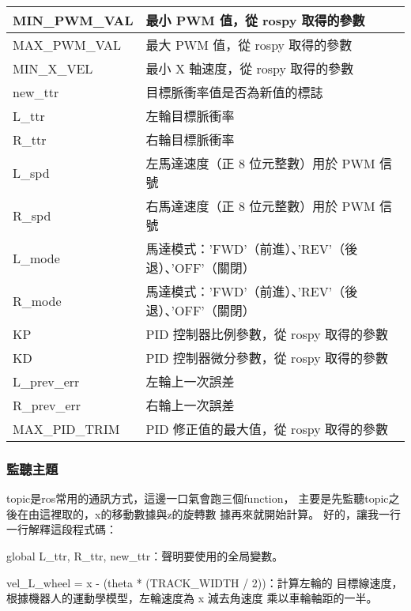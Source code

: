 \begin{table}[ht]
\begin{tabular}{|l|l|}
MIN\_PWM\_VAL    & 最小 PWM 值，從 rospy 取得的參數                             \\ \hline
MAX\_PWM\_VAL    & 最大 PWM 值，從 rospy 取得的參數                             \\ \hline
MIN\_X\_VEL      & 最小 X 軸速度，從 rospy 取得的參數                           \\ \hline
new\_ttr         & 目標脈衝率值是否為新值的標誌                                 \\ \hline
L\_ttr           & 左輪目標脈衝率                                               \\ \hline
R\_ttr           & 右輪目標脈衝率                                               \\ \hline
L\_spd           & 左馬達速度（正 8 位元整數）用於 PWM 信號                      \\ \hline
R\_spd           & 右馬達速度（正 8 位元整數）用於 PWM 信號                      \\ \hline
L\_mode          & 馬達模式：'FWD'（前進）、'REV'（後退）、'OFF'（關閉）        \\ \hline
R\_mode          & 馬達模式：'FWD'（前進）、'REV'（後退）、'OFF'（關閉）        \\ \hline
KP               & PID 控制器比例參數，從 rospy 取得的參數                      \\ \hline
KD               & PID 控制器微分參數，從 rospy 取得的參數                      \\ \hline
L\_prev\_err     & 左輪上一次誤差                                               \\ \hline
R\_prev\_err     & 右輪上一次誤差                                               \\ \hline
MAX\_PID\_TRIM   & PID 修正值的最大值，從 rospy 取得的參數                      \\ \hline
\end{tabular}
\end{table}

\subsubsection{監聽主題}
topic是ros常用的通訊方式，這邊一口氣會跑三個function，
主要是先監聽topic之後在由這裡取的，x的移動數據與z的旋轉數
據再來就開始計算。
好的，讓我一行一行解釋這段程式碼：

global L\_ttr, R\_ttr, new\_ttr：聲明要使用的全局變數。

vel\_L\_wheel = x - (theta * (TRACK\_WIDTH / 2))：計算左輪的
目標線速度，根據機器人的運動學模型，左輪速度為 x 減去角速度
乘以車輪軸距的一半。

